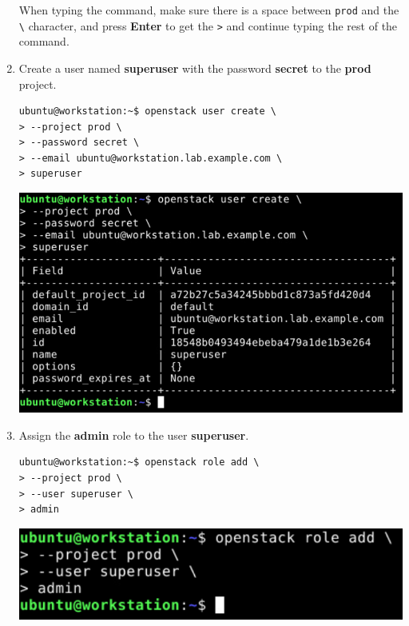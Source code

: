 \documentclass[letterpaper, 12pt]{article}
\begin{document}
\begin{enumerate}
\begin{tipbox}{}
    When typing the command, make sure there is a space between \texttt{prod} and the \texttt{\textbackslash}
    character, and press \textbf{Enter} to get the \texttt{>} and continue typing the rest of the command.
\end{tipbox}

    \item Create a user named \textbf{superuser} with the password \textbf{secret} to the \textbf{prod} project.
\begin{lstlisting}
ubuntu@workstation:~$ openstack user create \
> --project prod \
> --password secret \
> --email ubuntu@workstation.lab.example.com \
> superuser
\end{lstlisting}

\begin{center}
    \includegraphics[width=\linewidth]{images/part1/step5.png}
\end{center}

    \item Assign the \textbf{admin} role to the user \textbf{superuser}.
\begin{lstlisting}
ubuntu@workstation:~$ openstack role add \
> --project prod \
> --user superuser \
> admin
\end{lstlisting}

    \begin{center}
        \includegraphics[width=\linewidth]{images/part1/step6.png}
    \end{center}


\end{enumerate}
\end{document}
